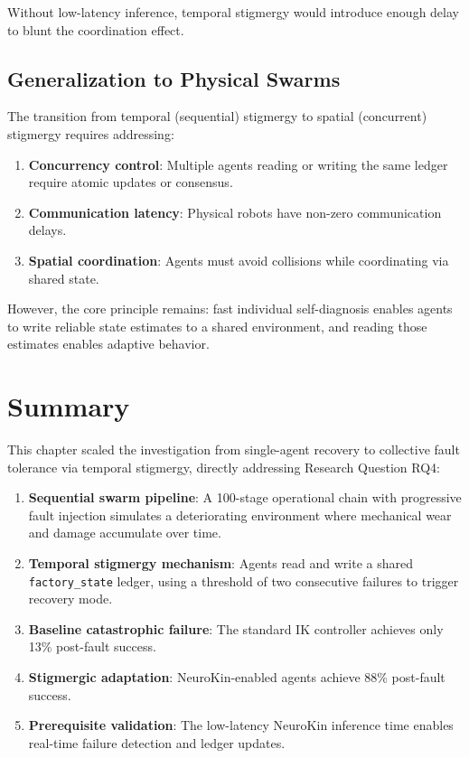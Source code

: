 \documentclass[12pt,a4paper,oneside]{report}
\begin{document}
Without low-latency inference, temporal stigmergy would introduce enough delay to blunt the coordination effect.

\subsection{Generalization to Physical Swarms}
\label{subsec:generalization_to_physical_swarms}

The transition from temporal (sequential) stigmergy to spatial (concurrent) stigmergy requires addressing:
\begin{enumerate}
    \item \textbf{Concurrency control}: Multiple agents reading or writing the same ledger require atomic updates or consensus.
    \item \textbf{Communication latency}: Physical robots have non-zero communication delays.
    \item \textbf{Spatial coordination}: Agents must avoid collisions while coordinating via shared state.
\end{enumerate}

However, the core principle remains: fast individual self-diagnosis enables agents to write reliable state estimates to a shared environment, and reading those estimates enables adaptive behavior.

\section{Summary}

This chapter scaled the investigation from single-agent recovery to collective fault tolerance via temporal stigmergy, directly addressing Research Question RQ4:

\begin{enumerate}
    \item \textbf{Sequential swarm pipeline}: A 100-stage operational chain with progressive fault injection simulates a deteriorating environment where mechanical wear and damage accumulate over time.
    \item \textbf{Temporal stigmergy mechanism}: Agents read and write a shared \texttt{factory\_state} ledger, using a threshold of two consecutive failures to trigger recovery mode.
    \item \textbf{Baseline catastrophic failure}: The standard IK controller achieves only 13\% post-fault success.
    \item \textbf{Stigmergic adaptation}: NeuroKin-enabled agents achieve 88\% post-fault success.
    \item \textbf{Prerequisite validation}: The low-latency NeuroKin inference time enables real-time failure detection and ledger updates.
\end{enumerate}
\end{document}
